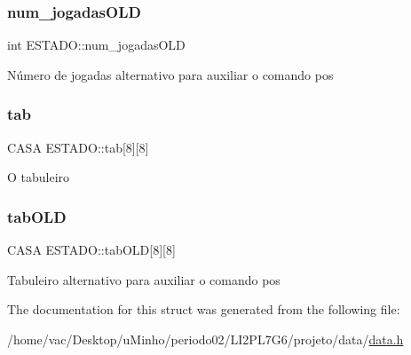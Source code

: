 \subsubsection{\texorpdfstring{num\+\_\+jogadas\+O\+LD}{num\_jogadasOLD}}
{\footnotesize\ttfamily int E\+S\+T\+A\+D\+O\+::num\+\_\+jogadas\+O\+LD}

Número de jogadas alternativo para auxiliar o comando pos \mbox{\label{structESTADO_ab56f0f1be16954d3768b4174d14c087d}} 
\subsubsection{\texorpdfstring{tab}{tab}}
{\footnotesize\ttfamily C\+A\+SA E\+S\+T\+A\+D\+O\+::tab\mbox{[}8\mbox{]}\mbox{[}8\mbox{]}}

O tabuleiro \mbox{\label{structESTADO_a66bbe063098bbfc016ee8a21672e2bbd}} 
\subsubsection{\texorpdfstring{tab\+O\+LD}{tabOLD}}
{\footnotesize\ttfamily C\+A\+SA E\+S\+T\+A\+D\+O\+::tab\+O\+LD\mbox{[}8\mbox{]}\mbox{[}8\mbox{]}}

Tabuleiro alternativo para auxiliar o comando pos 

The documentation for this struct was generated from the following file\+:\begin{DoxyCompactItemize}
\item 
/home/vac/\+Desktop/u\+Minho/periodo02/\+L\+I2\+P\+L7\+G6/projeto/data/\hyperlink{data_8h}{data.\+h}\end{DoxyCompactItemize}

